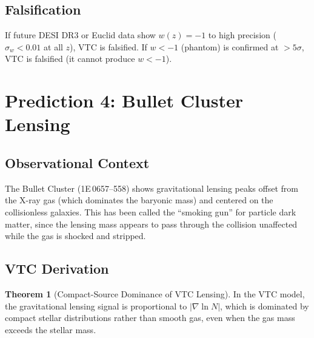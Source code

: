 \documentclass[11pt,a4paper]{article}
\theoremstyle{definition}
\newtheorem{theorem}{Theorem}[section]
\begin{document}
\subsection{Falsification}

If future DESI DR3 or Euclid data show $w(z) = -1$ to high precision ($\sigma_w < 0.01$ at all $z$), VTC is falsified. If $w < -1$ (phantom) is confirmed at $>5\sigma$, VTC is falsified (it cannot produce $w < -1$).

\section{Prediction 4: Bullet Cluster Lensing}
\label{sec:p4}

\subsection{Observational Context}

The Bullet Cluster (1E\,0657--558) shows gravitational lensing peaks offset from the X-ray gas (which dominates the baryonic mass) and centered on the collisionless galaxies. This has been called the ``smoking gun'' for particle dark matter, since the lensing mass appears to pass through the collision unaffected while the gas is shocked and stripped.

\subsection{VTC Derivation}

\begin{theorem}[Compact-Source Dominance of VTC Lensing]
\label{thm:p4}
In the VTC model, the gravitational lensing signal is proportional to $|\nabla \ln N|$, which is dominated by compact stellar distributions rather than smooth gas, even when the gas mass exceeds the stellar mass.
\end{theorem}
\end{document}
